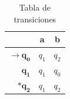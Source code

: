 \documentclass[12pt, twoside, openright]{report} %
\begin{document}
\begin{multicols}{2}
	\begin{table}[H]
		\centering
		\begin{tabular}{r|c|c|}
			\cline{2-3}
			\multicolumn{1}{l|}{}                                & \textbf{a} & \textbf{b} \\ \hline
			\multicolumn{1}{|r|}{$\boldsymbol{\rightarrow q_0}$} & $q_1$      & $q_2$      \\
			\multicolumn{1}{|r|}{$\boldsymbol{q_1}$}             & $q_1$      & $q_0$      \\
			\multicolumn{1}{|r|}{$\boldsymbol{*q_2}$}            & $q_1$      & $q_2$      \\ \hline
		\end{tabular}
		\caption{Tabla de transiciones}
	\end{table}

	\columnbreak
	\begin{figure}[H]
		{ %

		\begin{tikzpicture}[x=0.75pt,y=0.75pt,yscale=-1,xscale=1]


\end{tikzpicture}}
\end{figure}
\end{multicols}
\end{document}
